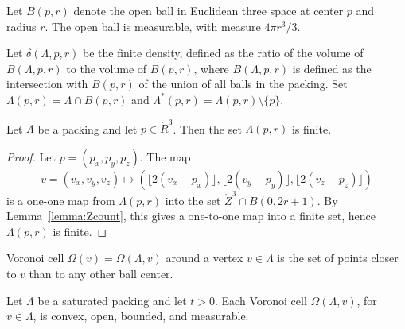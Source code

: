 


  Let $B(p,r)$ denote the open ball in
Euclidean three space at center $p$ and radius $r$.  The open ball
is measurable, with measure $4\pi r^3/3$.



Let $\delta(\Lambda,p,r)$ be the finite density, defined as the
ratio of the volume of $B(\Lambda,p,r)$ to the volume of $B(p,r)$,
where $B(\Lambda,p,r)$ is defined as the intersection with
$B(p,r)$ of the union of all balls in the packing. Set
$\Lambda(p,r) = \Lambda \cap
B(p,r)$ and $\Lambda^*(p,r) = \Lambda(p,r)\setminus \{p\}$.

\begin{lemma}\label{lemma:Lambda-finite}
Let $\Lambda$ be a packing and let $p\in\ring{R}^3$.
Then the set $\Lambda(p,r)$ is finite.
\end{lemma}

\begin{proof}  Let $p = (p_x,p_y,p_z)$. The map
$$v=(v_x,v_y,v_z)\mapsto (\lfloor 2(v_x-p_x)
\rfloor, \lfloor 2(v_y-p_y) \rfloor, \lfloor 2(v_z-p_z) \rfloor)$$
is a one-one map from $\Lambda(p,r)$ into the set $\ring{Z}^3\cap B(0,2
r
 + 1)$.  By Lemma~\ref{lemma:Zcount}, this gives a one-to-one map
 into a finite set, hence $\Lambda(p,r)$ is finite.
\end{proof}


\begin{definition}\label{def:voronoi} Voronoi cell
$\Omega(v)=\Omega(\Lambda,v)$ around a
vertex $v\in \Lambda$ is the set of points closer to $v$ than to
any other ball center. 
\end{definition}

\begin{lemma} Let $\Lambda$ be a saturated packing and let $t>0$.
Each Voronoi cell $\Omega(\Lambda,v)$, for $v\in\Lambda$, is
convex, open, bounded, and measurable.
\end{lemma}

